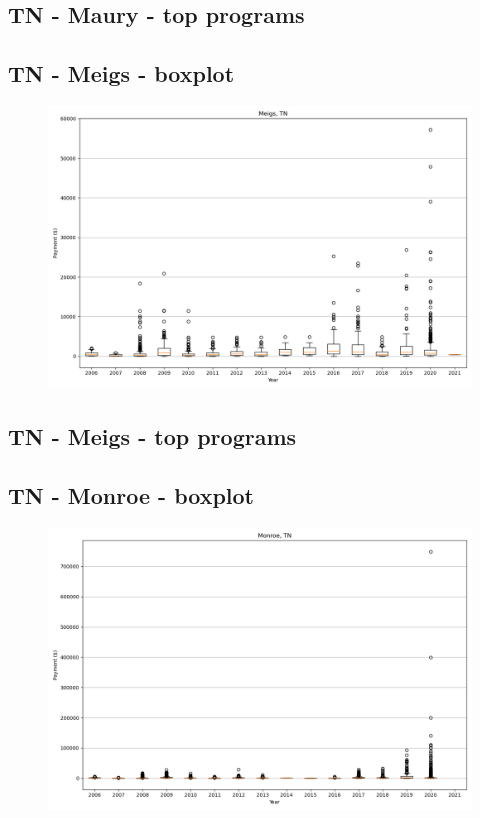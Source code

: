 \subsection*{TN - Maury - top programs}

\newpage
\subsection*{TN - Meigs - boxplot}
\begin{figure}[h]
\centering
\includegraphics[width=7in]{../output/boxplots/counties/Meigs-TN_boxplot.png}
\end{figure}


\subsection*{TN - Meigs - top programs}

\newpage
\subsection*{TN - Monroe - boxplot}
\begin{figure}[h]
\centering
\includegraphics[width=7in]{../output/boxplots/counties/Monroe-TN_boxplot.png}
\end{figure}


